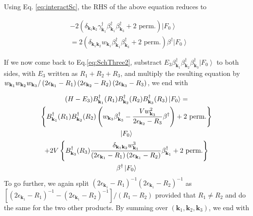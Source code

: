 \documentclass[aps,prb,superscriptaddress,twocolumn]{revtex4}
\begin{document}
Using Eq. \eqref{eq:interactSc}, the RHS of the above equation reduces to 

\begin{align*}
  &-2(\delta_{\mathbf{k} _1\mathbf{k} _2}\gamma^{\dagger}_{\mathbf{k} _1}\beta^{\dagger}_{\mathbf{k} _1}\beta^{\dagger}_{\mathbf{k} _3}+ \text{2 perm.})\left|F_0\right>\\
&= 2(\delta_{\mathbf{k} _1\mathbf{k} _2}w_{\mathbf{k} _1}\beta^{\dagger}_{\mathbf{k} _1}\beta^{\dagger}_{\mathbf{k} _3}+ \text{2 perm.})\beta^{\dagger}\left|F_0\right>
\end{align*}




If we now come back to Eq.\eqref{eq:SchThree2}, substract $E
_3\beta^{\dagger}_{\mathbf{k} _1}\beta^{\dagger}_{\mathbf{k}
_2}\beta^{\dagger}_{\mathbf{k} _3}\left|F_0\right>  $ to both sides, with $%
E _3$ written as $R_1+R_2+R_3$, and multiply the resulting equation
by $w_{\mathbf{k} _1}w_{\mathbf{k} _2}w_{\mathbf{k} _3}/\left(2\epsilon_{%
\mathbf{k} _1}-R_1\right) \left(2\epsilon_{\mathbf{k} _2}-R_2\right)
\left(2\epsilon_{\mathbf{k} _3}-R_3\right) $, we end with

\begin{multline}  \label{eq:SchThree3}
(H-E _3)B^{\dagger}_{\mathbf{k} _1}(R_1)B^{\dagger}_{\mathbf{k}
_2}(R_2)B^{\dagger}_{\mathbf{k} _3}(R_3)\left|F_0\right>  = \\
\left\{B^{\dagger}_{\mathbf{k} _1}(R_1)B^{\dagger}_{\mathbf{k}
_2}(R_2)\left(w_{\mathbf{k} _3}\beta^{\dagger}_{\mathbf{k} _3}-\frac{Vw_{%
\mathbf{k} _3}^2}{2\epsilon_{\mathbf{k} _2}-R_3}\beta^{\dagger}\right) +\text{%
2 perm.}\right\}  \\
\left|F_0\right>   \\
+2V\left\{B^{\dagger}_{\mathbf{k} _3}(R_3)\frac{\delta_{\mathbf{k} _1\mathbf{%
k} _2}w^3_{\mathbf{k} _1}}{\left(2\epsilon_{\mathbf{k} _1}-R_1\right)
\left(2\epsilon_{\mathbf{k} _1}-R_2\right) }\beta^{\dagger}_{\mathbf{k} _1}+%
\text{2 perm.}\right\}  \\
\beta^{\dagger}\left|F_0\right>  
\end{multline}
To go further, we again split $\left(2\epsilon_{\mathbf{k} _1}-R_1\right)
^{-1}\left(2\epsilon_{\mathbf{k} _1}-R_2\right) ^{-1}$ as $\left[%
\left(2\epsilon_{\mathbf{k} _1}-R_1\right) ^{-1}-\left(2\epsilon_{\mathbf{k}
_1}-R_2\right) ^{-1}\right] /\left(R_1-R_2\right) $ provided that $R_1\neq{}%
R_2$ and do the same for the two other products. By summing over $%
\left(\mathbf{k} _1,\mathbf{k} _2,\mathbf{k} _3\right) $, we end with
\end{document}
